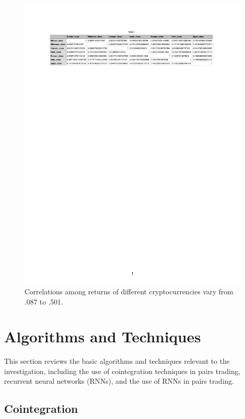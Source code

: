 \documentclass{article}
\begin{document}
\begin{figure}[]
\includegraphics[scale=0.50]{Cryptos_returns_corr.pdf}
\caption{Correlations among returns of different cryptocurrencies vary from .087 to .501.}
\label{FigCorrRet}
\end{figure}




\section{Algorithms and Techniques}

This section reviews the basic algorithms and techniques relevant to the investigation, including the use of cointegration techniques in pairs trading, recurrent neural networks (RNNs), and the use of RNNs in pairs trading. 

\subsection{Cointegration}
\end{document}
